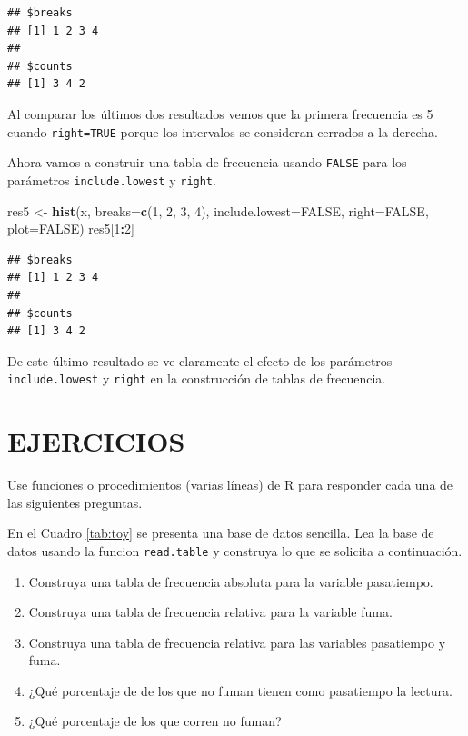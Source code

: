\documentclass[10pt,]{krantz}
\makeatletter
\newenvironment{Shaded}{\begin{snugshade}}{\end{snugshade}}
\newcommand{\KeywordTok}[1]{\textcolor[rgb]{0.13,0.29,0.53}{\textbf{#1}}}
\newcommand{\DataTypeTok}[1]{\textcolor[rgb]{0.13,0.29,0.53}{#1}}
\newcommand{\DecValTok}[1]{\textcolor[rgb]{0.00,0.00,0.81}{#1}}
\newcommand{\StringTok}[1]{\textcolor[rgb]{0.31,0.60,0.02}{#1}}
\newcommand{\OtherTok}[1]{\textcolor[rgb]{0.56,0.35,0.01}{#1}}
\newcommand{\OperatorTok}[1]{\textcolor[rgb]{0.81,0.36,0.00}{\textbf{#1}}}
\newcommand{\NormalTok}[1]{#1}
\providecommand{\tightlist}{%
  \setlength{\itemsep}{0pt}\setlength{\parskip}{0pt}}
\let\proglang=\textsf
\newenvironment{kframe}{%
\medskip{}
\setlength{\fboxsep}{.8em}
 \def\at@end@of@kframe{}%
 \ifinner\ifhmode%
  \def\at@end@of@kframe{\end{minipage}}%
  \begin{minipage}{\columnwidth}%
 \fi\fi%
 \def\FrameCommand##1{\hskip\@totalleftmargin \hskip-\fboxsep
 \colorbox{shadecolor}{##1}\hskip-\fboxsep
     \hskip-\linewidth \hskip-\@totalleftmargin \hskip\columnwidth}%
 \MakeFramed {\advance\hsize-\width
   \@totalleftmargin\z@ \linewidth\hsize
   \@setminipage}}%
 {\par\unskip\endMakeFramed%
 \at@end@of@kframe}
\renewenvironment{Shaded}{\begin{kframe}}{\end{kframe}}
\makeatother
\begin{document}
\begin{verbatim}
## $breaks
## [1] 1 2 3 4
## 
## $counts
## [1] 3 4 2
\end{verbatim}

Al comparar los últimos dos resultados vemos que la primera frecuencia
es 5 cuando \texttt{right=TRUE} porque los intervalos se consideran
cerrados a la derecha.

Ahora vamos a construir una tabla de frecuencia usando \texttt{FALSE}
para los parámetros \texttt{include.lowest} y \texttt{right}.

\begin{Shaded}
\begin{Highlighting}[]
\NormalTok{res5 <-}\StringTok{ }\KeywordTok{hist}\NormalTok{(x, }\DataTypeTok{breaks=}\KeywordTok{c}\NormalTok{(}\DecValTok{1}\NormalTok{, }\DecValTok{2}\NormalTok{, }\DecValTok{3}\NormalTok{, }\DecValTok{4}\NormalTok{),}
             \DataTypeTok{include.lowest=}\OtherTok{FALSE}\NormalTok{, }\DataTypeTok{right=}\OtherTok{FALSE}\NormalTok{,}
             \DataTypeTok{plot=}\OtherTok{FALSE}\NormalTok{)}
\NormalTok{res5[}\DecValTok{1}\OperatorTok{:}\DecValTok{2}\NormalTok{]}
\end{Highlighting}
\end{Shaded}

\begin{verbatim}
## $breaks
## [1] 1 2 3 4
## 
## $counts
## [1] 3 4 2
\end{verbatim}

De este último resultado se ve claramente el efecto de los parámetros
\texttt{include.lowest} y \texttt{right} en la construcción de tablas de
frecuencia.

\section*{EJERCICIOS}\label{ejercicios-4}


Use funciones o procedimientos (varias líneas) de \proglang{R} para
responder cada una de las siguientes preguntas.

En el Cuadro \ref{tab:toy} se presenta una base de datos sencilla. Lea
la base de datos usando la funcion \texttt{read.table} y construya lo
que se solicita a continuación.

\begin{enumerate}
\def\labelenumi{\arabic{enumi}.}
\tightlist
\item
  Construya una tabla de frecuencia absoluta para la variable
  pasatiempo.
\item
  Construya una tabla de frecuencia relativa para la variable fuma.
\item
  Construya una tabla de frecuencia relativa para las variables
  pasatiempo y fuma.
\item
  ¿Qué porcentaje de de los que no fuman tienen como pasatiempo la
  lectura.
\item
  ¿Qué porcentaje de los que corren no fuman?
\end{enumerate}
\end{document}
